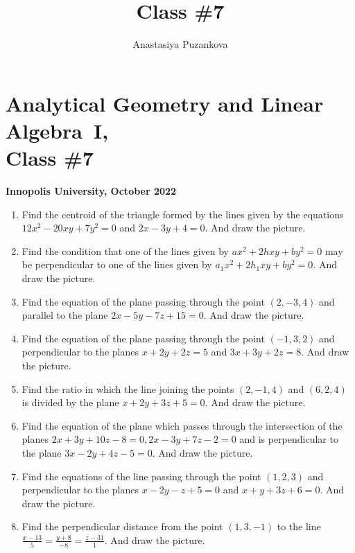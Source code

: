 \documentclass[a4paper,10pt]{article}
\title{Class \#7}
\author{Anastasiya Puzankova}
\date{}
\begin{document}
\section*{Analytical Geometry and Linear Algebra~I, \\ Class \#7}
\noindent\textbf{Innopolis University, October 2022}
\\

\begin{enumerate}

\item
Find the centroid of the triangle formed by the lines given by the equations $12x^2 - 20xy + 7y^2 = 0$ and $2x - 3y + 4 = 0$. And draw the picture.

\item %
Find the condition that one of the lines given by $ax^2 + 2hxy + by^2 = 0$ may be perpendicular to one of the lines given by $a_1x^2 + 2h_1xy + by^2 = 0$. And draw the picture.

\item %
Find the equation of the plane passing through the point $(2, -3, 4)$ and parallel to the plane $2x - 5y - 7z + 15 = 0$. And draw the picture.

\item %
Find the equation of the plane passing through the point $(-1, 3, 2)$ and perpendicular to the planes $x + 2y + 2z = 5$ and $3x + 3y + 2z = 8$. And draw the picture.

\item %
Find the ratio in which the line joining the points $(2, -1, 4)$ and $(6, 2, 4)$ is divided by the plane $x + 2y + 3z + 5 = 0$. And draw the picture.

\item %
Find the equation of the plane which passes through the intersection of the planes $2x + 3y + 10z - 8 = 0, 2x - 3y + 7z - 2 = 0$ and is perpendicular to the plane $3x - 2y + 4z - 5 = 0$. And draw the picture.

\item %
Find the equations of the line passing through the point $(1, 2, 3)$ and perpendicular to the planes $x - 2y - z + 5 = 0$ and $x + y + 3z + 6 = 0$. And draw the picture.

\item %
Find the perpendicular distance from the point $(1, 3, -1)$ to the line \\ $\frac{x-13}{5} = \frac{y+8}{-8} = \frac{z-31}{1}$. And draw the picture.


\end{enumerate}
\end{document}
